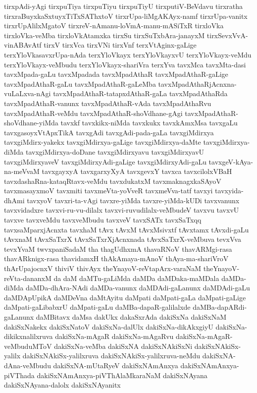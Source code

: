 {tirxpAdi-yAgi
tirxpuTiya
tirxpuTiyu
tirxpuTiyU
tirxputiV-BeVdavu
tirxratha
tirxraBuyxkaSxtuyxTiTxSAThxtoV
tirxrUpa-liMgAKAyx-namf
tirxrUpa-vanitx
tirxrUpAlilxMgatoV
tirxreV-nAmanu-loVmA-manu-mASiTxR
tirxloVka
tirxloVka-veMba
tirxloVkAtamxka
tirxSu
tirxSuTxbAra-janayxM
tirxSevxVvA-vinABAvAtf
tirxV
tirxVca
tirxVNi
tirxVnf
terxVtAginx-gaLige
terxYloVkasavxrUpa-nAda
terxYloVkayx
terxYloVkayxvU
terxYloVkayx-veMdu
terxYloVkayx-veMbudu
terxYloVkayx-shariVra
terxYva
tavxMca
tavxMta-dasi
tavxMpada-gaLu
tavxMpadada
tavxMpadAthaR
tavxMpadAthaR-gaLige
tavxMpadAthaR-gaLu
tavxMpadAthaR-gaLeMba
tavxMpadAthaRjAcnxna-vuLaLxva-nAgi
tavxMpadAthaR-tatapxdAthaR-gaLa
tavxMpadAthaRda
tavxMpadAthaR-vanunx
tavxMpadAthaR-vAda
tavxMpadAthaRvu
tavxMpadAthaR-veMdu
tavxMpadAthaR-shoVdhane-gAgi
tavxMpadAthaR-shoVdhane-yiMda
tavxkf
tavxkikx-niMda
tavxkukx
tavxkAmxMsa
tavxgaLu
tavxgasoyxVtApxTikA
tavxgAdi
tavxgAdi-pada-gaLa
tavxgiMdirxya
tavxgiMdirx-yakekx
tavxgiMdirxya-gaLige
tavxgiMdirxya-daMte
tavxgiMdirxya-diMda
tavxgiMdirxya-doDane
tavxgiMdirxyavu
tavxgiMdirxyavU
tavxgiMdirxyaveV
tavxgiMdirxyAdi-gaLige
tavxgiMdirxyAdi-gaLu
tavxgeV-kAya-na-meVvaM
tavxgayxyA
tavxgarxyXyA
tavxgevxY
tavxca
tavxcilolxVBaH
tavxdashaRna-kataqRtavx-veMdu
tavxdukatxM
tavxmaknagxkaSAyoV
tavxmasayxmoV
tavxmiti
tavxmeVta-yoVveR
tavxmeVva-tatf
tavxyi
tavxyida-dhAmi
tavxyoV
tavxri-ta-vAgi
tavxre-yiMda
tavxre-yiMda-kUDi
tavxvanunx
tavxvidadxre
tavxvi-ru-vu-dilalx
tavxvi-ruvudilalx-veMbudeV
tavxvu
tavxvU
tavxve
tavxveMdu
tavxveMbudu
tavxveV
tavxSATx
tavxSaTxqq
tavxsaMparxjAcnxta
tavxhaM
tAvx
tAvxM
tAvxMsivxtf
tAvxtamx
tAvxdi-gaLu
tAvxnaM
tAvxSaTxrX
tAvxSaTxrXjAcnxnada
tAvxSaTxrX-veMbuva
tevxVva
tevxYvaM
twvxpaniSadaM
tha
thagUdhxmA
thavaRNoV
thavARMgi-rasa
thavARknigx-rasa
thavidamxH
thAkAmaya-mAnoV
thAya-ma-shariVroV
thArUpajocnxV
thiviV
thivAyx
theYnayoV-reVtapArx-varaNaM
theYnayoV-reVta-dananxM
da
daM
daMTu-gaLiMda
daMDa
daMDaka-maMDala
daMDa-diMda
daMDa-dhAra-NAdi
daMDa-vanunx
daMDAdi-gaLanunx
daMDAdi-gaLu
daMDApUpikA
daMDeVna
daMtAyitu
daMpati
daMpati-gaLa
daMpati-gaLige
daMpati-gaLibabxrU
daMpati-gaLu
daMBa-dapaR-galilalxde
daMBa-dapARdi-gaLanunx
daMBitavx
daMsa
dakUkx
dakaSxrAda
dakiSxNa
dakiSxNaM
dakiSxNakekx
dakiSxNatoV
dakiSxNa-dalUlx
dakiSxNa-dikAkxgiyU
dakiSxNa-dikikxnalilxruva
dakiSxNa-mAgaR
dakiSxNa-mAgaRvu
dakiSxNa-mAgaR-veMbuduMToV
dakiSxNa-veMba
dakiSxNA
dakiSxNAkiSxNi
dakiSxNAkiSx-yalilx
dakiSxNAkiSx-yalilxruva
dakiSxNAkiSx-yalilxruva-neMdu
dakiSxNA-dAna-veMbudu
dakiSxNA-mUtaRyeV
dakiSxNAmAnxya
dakiSxNAmAnxya-piVThada
dakiSxNAmAnxya-piVThAlaMkaraNaM
dakiSxNAyana
dakiSxNAyana-dalolx
dakiSxNAyanitx
}
